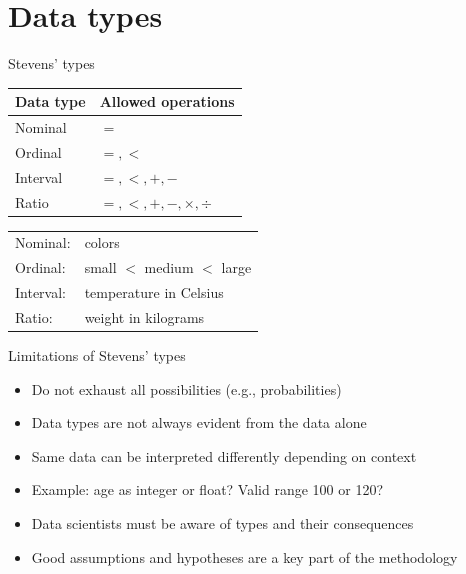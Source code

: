 \section{Data types}

\begin{frame}{Stevens' types}
  \centering
  \begin{tabular}{ll}
    \toprule
    \textbf{Data type} & \textbf{Allowed operations} \\
    \midrule
    Nominal  & $=$ \\
    Ordinal  & $=, <$ \\
    Interval & $=, <, +, -$ \\
    Ratio    & $=, <, +, -, \times, \div$ \\
    \bottomrule
  \end{tabular}

  \vspace{0.5cm}
  \small
  \begin{tabular}{ll}
    Nominal:  & colors \\
    Ordinal:  & small $<$ medium $<$ large \\
    Interval: & temperature in Celsius \\
    Ratio:    & weight in kilograms \\
  \end{tabular}
\end{frame}

\begin{frame}{Limitations of Stevens' types}
  \begin{itemize}
    \item Do not exhaust all possibilities (e.g., probabilities)
    \item Data types are not always evident from the data alone
    \item Same data can be interpreted differently depending on context
    \item Example: age as integer or float? Valid range 100 or 120?
    \item Data scientists must be aware of types and their consequences
    \item Good assumptions and hypotheses are a key part of the methodology
  \end{itemize}
\end{frame}

